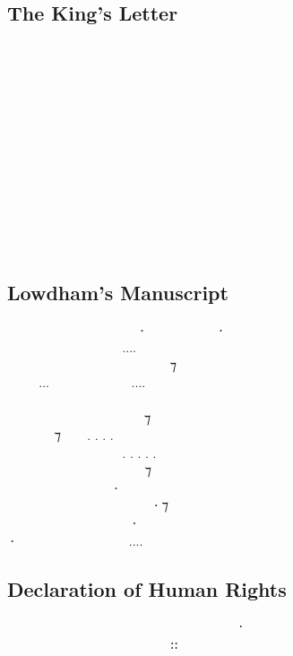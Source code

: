 \documentclass[11pt,a4paper]{article}
\begin{document}
\subsection*{The King’s Letter}
\begin{center}
\formal
  \\
   \\
   \\
     \\
    \\
     \\
     \\
       \\
    \\
    \\
    \\
   ‍ 
\end{center}

\subsection*{Lowdham’s Manuscript}
\formal
  ‍   ⸱‍  ‍ ⸱ \\
    ‍....  ‍  \\
  ‍   ‍ ‍ ⁊ ‍  \\
...  ....   \\
         ‍ \\
 ‍ ‍‍   ⁊  ‍ ‍ \\
 ‍ ⁊  . . . .  ‍ ‍‍   \\
   ‍ . . . . . ‍ ‍   \\
      ⁊    \\
   ‍⸱‍   ‍  \\
     ‍⸱ ⁊  ‍ \\
    ⸱    \\
⸱  ‍  .... ‍‍    \\

\subsection*{Declaration of Human Rights}
\formal
\begin{center}
           ⸱                   ⸬
\end{center}
\end{document}
